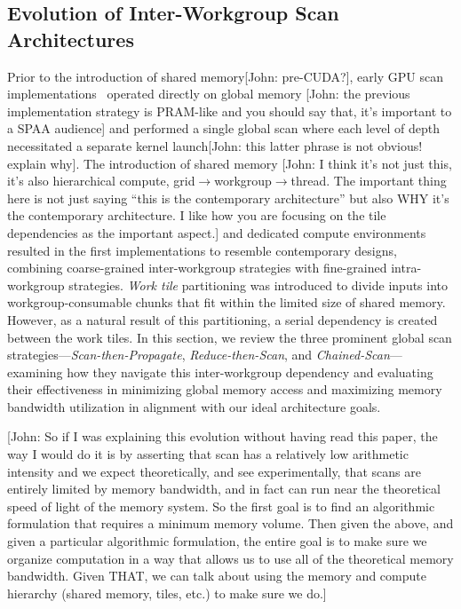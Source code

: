 \documentclass[sigconf]{acmart}
\newcommand{\john}[1]{{\footnotesize\color{cyan}[John: #1]}}
\begin{document}
\subsection{Evolution of Inter-Workgroup Scan Architectures}
Prior to the introduction of shared memory\john{pre-CUDA?}, early GPU scan implementations~\cite{Horn, Hensley, Greß, Sengupta} operated directly on global memory \john{the previous implementation strategy is PRAM-like and you should say that, it's important to a SPAA audience} and performed a single global scan where each level of depth necessitated a separate kernel launch\john{this latter phrase is not obvious! explain why}. The introduction of shared memory \john{I think it's not just this, it's also hierarchical compute, grid$\rightarrow$workgroup$\rightarrow$thread. The important thing here is not just saying ``this is the contemporary architecture'' but also WHY it's the contemporary architecture. I like how you are focusing on the tile dependencies as the important aspect.} and dedicated compute environments resulted in the first implementations to resemble contemporary designs, combining coarse-grained inter-workgroup strategies with fine-grained intra-workgroup strategies. \emph{Work tile} partitioning was introduced to divide inputs into workgroup-consumable chunks that fit within the limited size of shared memory. However, as a natural result of this partitioning, a serial dependency is created between the work tiles. In this section, we review the three prominent global scan strategies—\emph{Scan-then-Propagate}, \emph{Reduce-then-Scan}, and \emph{Chained-Scan}—examining how they navigate this inter-workgroup dependency and evaluating their effectiveness in minimizing global memory access and maximizing memory bandwidth utilization in alignment with our ideal architecture goals.

\john{So if I was explaining this evolution without having read this paper, the way I would do it is by asserting that scan has a relatively low arithmetic intensity and we expect theoretically, and see experimentally, that scans are entirely limited by memory bandwidth, and in fact can run near the theoretical speed of light of the memory system. So the first goal is to find an algorithmic formulation that requires a minimum memory volume. Then given the above, and given a particular algorithmic formulation, the entire goal is to make sure we organize computation in a way that allows us to use all of the theoretical memory bandwidth. Given THAT, we can talk about using the memory and compute hierarchy (shared memory, tiles, etc.) to make sure we do.}
\end{document}
